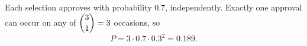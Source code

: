 Each selection approves with probability \(0.7\), independently. Exactly one approval can occur on any of \(\dbinom31=3\) occasions, so
\[
P=3\cdot 0.7\cdot 0.3^2=\boxed{0.189}.
\]
